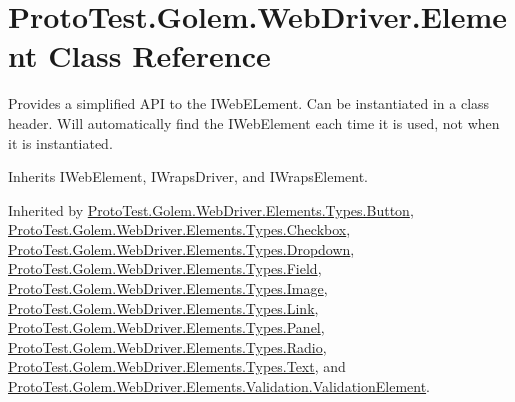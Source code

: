 \hypertarget{class_proto_test_1_1_golem_1_1_web_driver_1_1_element}{\section{Proto\-Test.\-Golem.\-Web\-Driver.\-Element Class Reference}
\label{class_proto_test_1_1_golem_1_1_web_driver_1_1_element}
}


Provides a simplified A\-P\-I to the I\-Web\-E\-Lement. Can be instantiated in a class header. Will automatically find the I\-Web\-Element each time it is used, not when it is instantiated.  




Inherits I\-Web\-Element, I\-Wraps\-Driver, and I\-Wraps\-Element.



Inherited by \hyperlink{class_proto_test_1_1_golem_1_1_web_driver_1_1_elements_1_1_types_1_1_button}{Proto\-Test.\-Golem.\-Web\-Driver.\-Elements.\-Types.\-Button}, \hyperlink{class_proto_test_1_1_golem_1_1_web_driver_1_1_elements_1_1_types_1_1_checkbox}{Proto\-Test.\-Golem.\-Web\-Driver.\-Elements.\-Types.\-Checkbox}, \hyperlink{class_proto_test_1_1_golem_1_1_web_driver_1_1_elements_1_1_types_1_1_dropdown}{Proto\-Test.\-Golem.\-Web\-Driver.\-Elements.\-Types.\-Dropdown}, \hyperlink{class_proto_test_1_1_golem_1_1_web_driver_1_1_elements_1_1_types_1_1_field}{Proto\-Test.\-Golem.\-Web\-Driver.\-Elements.\-Types.\-Field}, \hyperlink{class_proto_test_1_1_golem_1_1_web_driver_1_1_elements_1_1_types_1_1_image}{Proto\-Test.\-Golem.\-Web\-Driver.\-Elements.\-Types.\-Image}, \hyperlink{class_proto_test_1_1_golem_1_1_web_driver_1_1_elements_1_1_types_1_1_link}{Proto\-Test.\-Golem.\-Web\-Driver.\-Elements.\-Types.\-Link}, \hyperlink{class_proto_test_1_1_golem_1_1_web_driver_1_1_elements_1_1_types_1_1_panel}{Proto\-Test.\-Golem.\-Web\-Driver.\-Elements.\-Types.\-Panel}, \hyperlink{class_proto_test_1_1_golem_1_1_web_driver_1_1_elements_1_1_types_1_1_radio}{Proto\-Test.\-Golem.\-Web\-Driver.\-Elements.\-Types.\-Radio}, \hyperlink{class_proto_test_1_1_golem_1_1_web_driver_1_1_elements_1_1_types_1_1_text}{Proto\-Test.\-Golem.\-Web\-Driver.\-Elements.\-Types.\-Text}, and \hyperlink{class_proto_test_1_1_golem_1_1_web_driver_1_1_elements_1_1_validation_1_1_validation_element}{Proto\-Test.\-Golem.\-Web\-Driver.\-Elements.\-Validation.\-Validation\-Element}.

